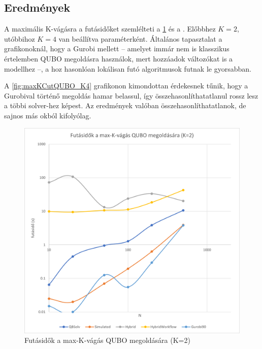 \subsection{Eredmények}


A maximális K-vágásra a futásidőket szemlélteti a \ref{fig:maxKCutQUBO_K2} és a . Előbbhez $K=2$, utóbbihoz $K=4$ van beállítva paraméterként. Általános tapasztalat a grafikonoknál, hogy a Gurobi mellett -- amelyet immár nem is klasszikus értelemben QUBO megoldásra használok, mert hozzáadok változókat is a modellhez --, a hoz hasonlóan lokálisan futó algoritmusok futnak le gyorsabban.

A \ref{fig:maxKCutQUBO_K4} grafikonon kimondottan érdekesnek tűnik, hogy a Gurobival történő megoldás hamar belassul, így összehasonlíthatatlanul rossz lesz a többi solver-hez képest. Az eredmények valóban összehasonlíthatatlanok, de sajnos más okból kifolyólag.

\begin{figure}[!ht]
	\centering
	\includegraphics[width=150mm, keepaspectratio]{figures/diagrams/maxKCutQUBO_K2.png}
	\caption{Futásidők a max-K-vágás QUBO megoldására (K=2)}
	\label{fig:maxKCutQUBO_K2}
\end{figure}

